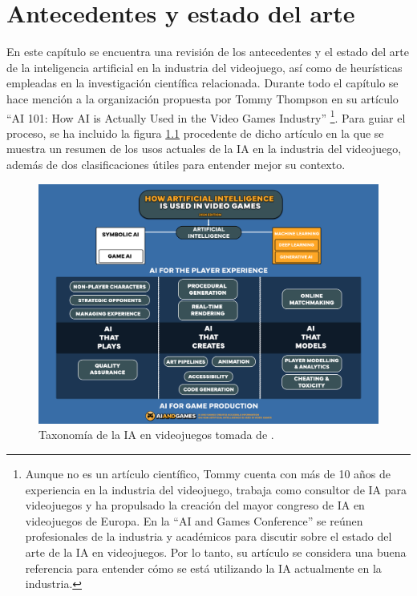 \chapter{Antecedentes y estado del arte} \label{chap:antecedentes}

En este capítulo se encuentra una revisión de los antecedentes y el estado del arte de la inteligencia artificial en la industria del videojuego, así como de heurísticas empleadas en la investigación científica relacionada. Durante todo el capítulo se hace mención a la organización propuesta por Tommy Thompson en su artículo ``AI 101: How AI is Actually Used in the Video Games Industry'' \cite{thompson_how_2025}\footnote{Aunque no es un artículo científico, Tommy cuenta con más de 10 años de experiencia en la industria del videojuego, trabaja como consultor de IA para videojuegos y ha propulsado la creación del mayor congreso de IA en videojuegos de Europa. En la ``AI and Games Conference'' se reúnen profesionales de la industria y académicos para discutir sobre el estado del arte de la IA en videojuegos. Por lo tanto, su artículo se considera una buena referencia para entender cómo se está utilizando la IA actualmente en la industria.}. Para guiar el proceso, se ha incluido la figura \ref{fig:ia_taxonomia} procedente de dicho artículo en la que se muestra un resumen de los usos actuales de la IA en la industria del videojuego, además de dos clasificaciones útiles para entender mejor su contexto.

\begin{figure}
	\centering
	\includegraphics[width=1.0\textwidth]{img/AIforGames-Taxonomy.png}
	\caption{Taxonomía de la IA en videojuegos tomada de \cite{thompson_how_2025}.}
	\label{fig:ia_taxonomia}
\end{figure}

